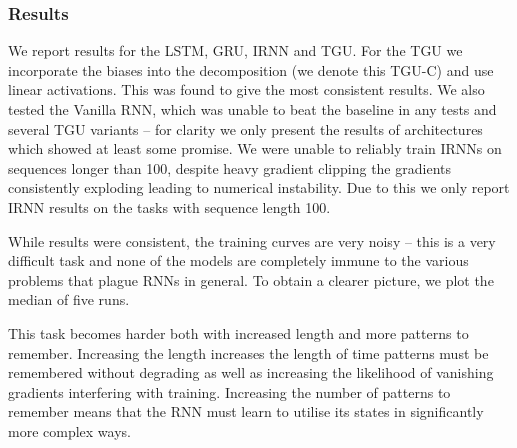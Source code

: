 \subsubsection{Results}
We report results for the LSTM, GRU, IRNN and TGU. For the TGU we incorporate the biases into
the decomposition (we denote this TGU-C) and use linear activations. This was found to give the
most consistent results. We also tested the Vanilla RNN, which was unable to beat the baseline in
any tests and several TGU variants -- for clarity we only present the results of architectures which
showed at least some promise. We were unable to reliably train IRNNs on sequences longer than
100, despite heavy gradient clipping the gradients
consistently exploding leading to numerical instability. Due to this we only report IRNN results on
the tasks with sequence length 100.

While results were consistent, the training curves are very noisy -- this is a very difficult task
and none of the models are completely immune to the various problems that plague RNNs in general.
To obtain a clearer picture, we plot the median of five runs.

This task becomes harder both with increased length and more patterns to remember. Increasing the
length increases the length of time patterns must be remembered without degrading as well as
increasing the likelihood of vanishing gradients interfering with training. Increasing the number
of patterns to remember means that the RNN must learn to utilise its states in significantly more
complex ways.

